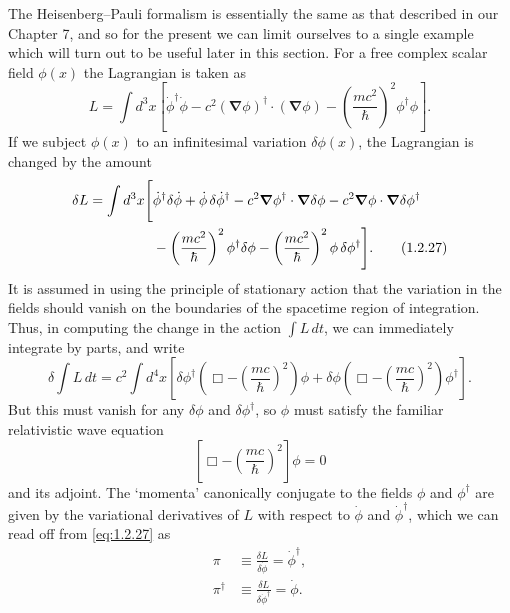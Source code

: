 The Heisenberg--Pauli formalism is essentially the same as that described in
our Chapter 7, and so for the present we can limit ourselves to a single
example which will turn out to be useful later in this section. For a free
complex scalar field $\phi(x)$ the Lagrangian is taken as
\begin{equation}
  L=\int d^3x\left[
    \dot\phi^{\dagger}\dot\phi
    -c^2(\boldsymbol\nabla\phi)^{\dagger}\cdot(\boldsymbol\nabla\phi)
    -\left(\frac{mc^2}{\hbar}\right)^2\phi^{\dagger}\phi
  \right].
  \tag{1.2.26}\label{eq:1.2.26}
\end{equation}
If we subject $\phi(x)$ to an infinitesimal variation $\delta\phi(x)$, the
Lagrangian is changed by the amount
\begin{align}
  \delta L=\int d^3x\Bigg[
    &\dot\phi^{\dagger}\delta\dot\phi
    +\dot\phi\,\delta\dot\phi^{\dagger}
    -c^2\boldsymbol\nabla\phi^{\dagger}\cdot
      \boldsymbol\nabla\delta\phi
    -c^2\boldsymbol\nabla\phi\cdot
      \boldsymbol\nabla\delta\phi^{\dagger}
  \notag\\
    &-\left(\frac{mc^2}{\hbar}\right)^2\phi^{\dagger}\delta\phi
    -\left(\frac{mc^2}{\hbar}\right)^2\phi\,\delta\phi^{\dagger}
  \Bigg].
  \tag{1.2.27}\label{eq:1.2.27}
\end{align}
It is assumed in using the principle of stationary action that the variation
in the fields should vanish on the boundaries of the spacetime region of
integration. Thus, in computing the change in the action $\int L\,dt$, we can
immediately integrate by parts, and write
\[
  \delta\int L\,dt=c^2\int d^4x\left[
    \delta\phi^{\dagger}
      \left(\Box-\left(\frac{mc}{\hbar}\right)^2\right)\phi
    +\delta\phi
      \left(\Box-\left(\frac{mc}{\hbar}\right)^2\right)\phi^{\dagger}
  \right].
\]
But this must vanish for any $\delta\phi$ and $\delta\phi^{\dagger}$, so
$\phi$ must satisfy the familiar relativistic wave equation
\begin{equation}
  \left[\Box-\left(\frac{mc}{\hbar}\right)^2\right]\phi=0
  \tag{1.2.28}\label{eq:1.2.28}
\end{equation}
and its adjoint. The `momenta' canonically conjugate to the fields $\phi$ and
$\phi^{\dagger}$ are given by the variational derivatives of $L$ with respect
to $\dot\phi$ and $\dot\phi^{\dagger}$, which we can read off from \eqref{eq:1.2.27} as
\begin{align}
  \pi&\equiv\frac{\delta L}{\delta\dot\phi}=\dot\phi^{\dagger},
  \tag{1.2.29}\label{eq:1.2.29}\\
  \pi^{\dagger}&\equiv\frac{\delta L}{\delta\dot\phi^{\dagger}}=\dot\phi.
  \tag{1.2.30}\label{eq:1.2.30}
\end{align}
